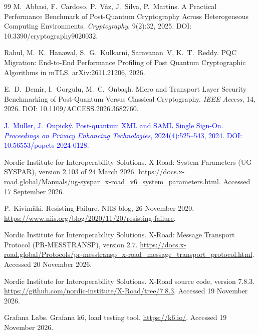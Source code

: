\documentclass[conference,a4paper]{IEEEtran}
\newcommand{\newtext}[1]{{\color{blue}#1}}
\begin{document}
\begin{thebibliography}{99}
\newtext{M.~Abbasi, F.~Cardoso, P.~V{\'a}z, J.~Silva, P.~Martins.
\newblock A Practical Performance Benchmark of Post-Quantum Cryptography Across Heterogeneous
Computing Environments.
\newblock \emph{Cryptography}, 9(2):32, 2025.
\newblock DOI: 10.3390/cryptography9020032.}

\newtext{Rahul, M.~K.~Hanawal, S.~G.~Kulkarni, Saravanan~V, K.~T.~Reddy.
\newblock PQC Migration: End-to-End Performance Profiling of Post Quantum Cryptographic Algorithms in
mTLS.
\newblock arXiv:2611.21206, 2026.}

\newtext{E.~D.~Demir, I.~Gorgulu, M.~C.~Onba{\c{s}}l{\i}.
\newblock Micro and Transport Layer Security Benchmarking of Post-Quantum Versus Classical
Cryptography.
\newblock \emph{IEEE Access}, 14, 2026.
\newblock DOI: 10.1109/ACCESS.2026.3682760.}

\textcolor{blue}{J.~M{\"u}ller, J.~Oupick{\'y}.
\newblock Post-quantum XML and SAML Single Sign-On.
\newblock \emph{Proceedings on Privacy Enhancing Technologies}, 2024(4):525--543, 2024.
\newblock DOI: 10.56553/popets-2024-0128.}

Nordic Institute for Interoperability Solutions.
\newblock X-Road: System Parameters (UG-SYSPAR)\newtext{, version 2.103 of 24 March 2026}.
\newblock \url{https://docs.x-road.global/Manuals/ug-syspar_x-road_v6_system_parameters.html}.
\newblock Accessed 17 September 2026.

P.~Kivim\"{a}ki.
\newblock Resisting Failure.
\newblock NIIS blog, \newtext{26} November 2020.
\newblock \url{https://www.niis.org/blog/2020/11/20/resisting-failure}.
\newblock \newtext{Accessed 19 November 2026.}

\newtext{Nordic Institute for Interoperability Solutions.
\newblock X-Road: Message Transport Protocol (PR-MESSTRANSP), version 2.7.
\newblock \url{https://docs.x-road.global/Protocols/pr-messtransp_x-road_message_transport_protocol.html}.
\newblock Accessed 20 November 2026.}

\newtext{Nordic Institute for Interoperability Solutions.
\newblock X-Road source code, version 7.8.3.
\newblock \url{https://github.com/nordic-institute/X-Road/tree/7.8.3}.
\newblock Accessed 19 November 2026.}

\newtext{Grafana Labs.
\newblock Grafana k6, load testing tool.
\newblock \url{https://k6.io/}.
\newblock Accessed 19 November 2026.}


\end{thebibliography}
\end{document}
